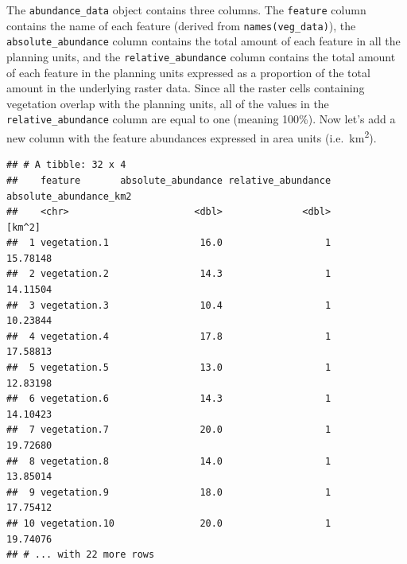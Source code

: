 \documentclass[12pt,]{book}
\newenvironment{Shaded}{\begin{snugshade}}{\end{snugshade}}
\newcommand{\KeywordTok}[1]{\textcolor[rgb]{0.13,0.29,0.53}{\textbf{#1}}}
\newcommand{\DecValTok}[1]{\textcolor[rgb]{0.00,0.00,0.81}{#1}}
\newcommand{\StringTok}[1]{\textcolor[rgb]{0.31,0.60,0.02}{#1}}
\newcommand{\CommentTok}[1]{\textcolor[rgb]{0.56,0.35,0.01}{\textit{#1}}}
\newcommand{\OperatorTok}[1]{\textcolor[rgb]{0.81,0.36,0.00}{\textbf{#1}}}
\newcommand{\NormalTok}[1]{#1}
\begin{document}
The \texttt{abundance\_data} object contains three columns. The
\texttt{feature} column contains the name of each feature (derived from
\texttt{names(veg\_data)}), the \texttt{absolute\_abundance} column
contains the total amount of each feature in all the planning units, and
the \texttt{relative\_abundance} column contains the total amount of
each feature in the planning units expressed as a proportion of the
total amount in the underlying raster data. Since all the raster cells
containing vegetation overlap with the planning units, all of the values
in the \texttt{relative\_abundance} column are equal to one (meaning
100\%). Now let's add a new column with the feature abundances expressed
in area units (i.e.~km\textsuperscript{2}).

\begin{Shaded}
\end{Shaded}

\begin{verbatim}
## # A tibble: 32 x 4
##    feature       absolute_abundance relative_abundance absolute_abundance_km2
##    <chr>                      <dbl>              <dbl>                 [km^2]
##  1 vegetation.1                16.0                  1               15.78148
##  2 vegetation.2                14.3                  1               14.11504
##  3 vegetation.3                10.4                  1               10.23844
##  4 vegetation.4                17.8                  1               17.58813
##  5 vegetation.5                13.0                  1               12.83198
##  6 vegetation.6                14.3                  1               14.10423
##  7 vegetation.7                20.0                  1               19.72680
##  8 vegetation.8                14.0                  1               13.85014
##  9 vegetation.9                18.0                  1               17.75412
## 10 vegetation.10               20.0                  1               19.74076
## # ... with 22 more rows
\end{verbatim}
\end{document}
